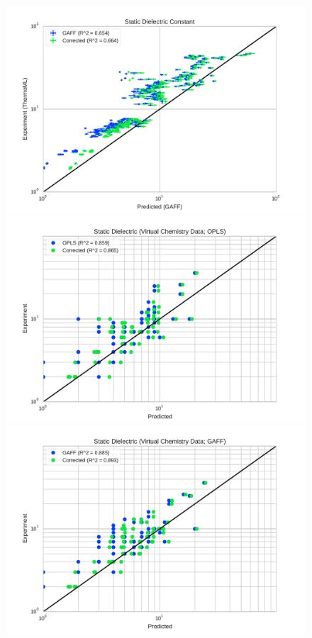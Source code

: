 \documentclass[journal=jacsat,manuscript=article]{achemso}
\begin{document}
\begin{figure}
\includegraphics[width=\columnwidth]{./figures/dielectrics_thermoml.pdf}

\includegraphics[width=\columnwidth]{./figures/dielectric_virtual_chemistry_opls.pdf}

\includegraphics[width=\columnwidth]{./figures/dielectric_virtual_chemistry_gaff.pdf}


\end{figure}
\end{document}
